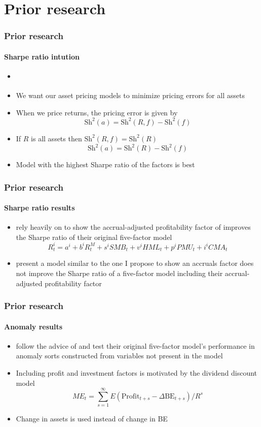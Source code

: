 \documentclass[notes]{beamer}  %
\begin{document}
\section{Prior research}

\begin{frame} \frametitle{Prior research} \framesubtitle{Sharpe ratio intution}
\begin{itemize}
    \item \textcite{barillas2016alpha}
    \item We want our asset pricing models to minimize pricing errors for
    all assets
    \item When we price returns, the pricing error is given by
    \[
    \text{Sh}^2(a) = \text{Sh}^2(R, f) - \text{Sh}^2(f)
    \]
    \item If $R$ is all assets then $\text{Sh}^2(R, f) = \text{Sh}^2(R)$
    \[
    \text{Sh}^2(a) = \text{Sh}^2(R) - \text{Sh}^2(f)
    \]
    \item Model with the highest Sharpe ratio of the factors is best
\end{itemize}
\end{frame}

\begin{frame} \frametitle{Prior research} \framesubtitle{Sharpe ratio results}
  \begin{itemize}
    \item \textcite{fama2016choosing} rely heavily on
    \textcite{barillas2016alpha} to show the accrual-adjusted profitability
    factor of \textcite{ball2016accruals} improves the Sharpe ratio of their
    original five-factor model \parencite{fama2015five}
    \begin{equation}
      R_t^i=a^i + b^iR_t^M + s^iSMB_t + v^iHML_t + p^iPMU_t + i^iCMA_t
    \end{equation}
    \item \textcite{ball2016accruals} present a model similar to the one I
    propose to show an accruals factor does not improve the Sharpe ratio of a
    five-factor model including their accrual-adjusted profitability factor
  \end{itemize}
\end{frame}

\begin{frame} \frametitle{Prior research} \framesubtitle{Anomaly results}
  \begin{itemize}
    \item \textcite{fama2016dissecting} follow the advice of
    \textcite{lewellen2010skeptical} and test their original five-factor
    model's performance in anomaly sorts constructed from variables not present
    in the model
    \item Including profit and investment factors is motivated by the dividend
    discount model \parencite{fama2006profitability}
    \[ME_t =
    \sum_{s=1}^\infty E\left( \text{Profit}_{t+s}-
    \Delta\text{BE}_{t+s}\right) /R^s\]
    \item Change in assets is used instead of change in BE
  \end{itemize}
\end{frame}
\end{document}
